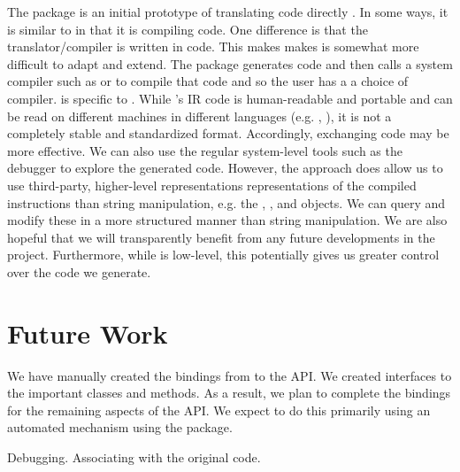 \documentclass[article]{jss}
\def\RClang{\Rpkg{RCIndex}}
\def\Rllvm{\Rpkg{Rllvm}}
\begin{document}
The  package is an initial prototype of translating \R{}
code directly \C. In some ways, it is similar to  in that
it is compiling \R{} code. One difference is that the
translator/compiler is written in \C{} code.  This makes makes is
somewhat more difficult to adapt and extend.  The package generates
\C{} code and then calls a system compiler such as \gcc{} or \clang{}
to compile that code and so the user has a a choice of compiler.
\Rllvm{} is specific to \llvm{}.  While \llvm's IR code is
human-readable and portable and can be read on different machines in
different languages (e.g. \R, \Python), it is not a completely stable
and standardized format. Accordingly, exchanging \C{} code may be more
effective.  We can also use the regular system-level tools such as the
debugger to explore the generated code.  However, the \Rllvm{}
approach does allow us to use third-party, higher-level
representations representations of the compiled instructions than
string manipulation, e.g. the , ,
 and  objects.  We can query
and modify these in a more structured manner than string manipulation.
We are also hopeful that we will transparently benefit from any future
developments in the \llvm{} project.  Furthermore, while \llvm{} is
low-level, this potentially gives us greater control over the code we
generate.



\section{Future Work}

We have manually created the bindings from \R{} to the \llvm{} API. We
created interfaces to the important classes and methods. As a result,
we plan to complete the bindings for the remaining aspects of the API.
We expect to do this primarily using an automated mechanism using the
\RClang{} package.

Debugging.
Associating with the original code.



\end{document}
